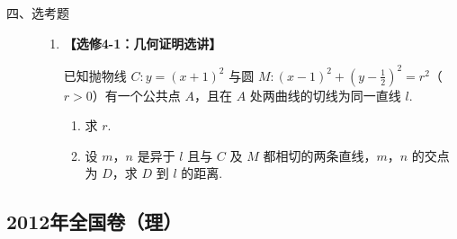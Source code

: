\begin{description}

    \item[四、选考题]

    \begin{enumerate}[leftmargin=5pt]

      \addtocounter{enumi}{+21}

        \item \textbf{【选修4-1：几何证明选讲】}

已知抛物线 \(C: y = (x + 1)^2\) 与圆 \(M: (x - 1)^2 + (y - \frac{1}{2})^2 = r^2\)（\(r > 0\)）有一个公共点 \(A\)，且在 \(A\) 处两曲线的切线为同一直线 \(l\).
\begin{enumerate}
\item 求 \(r\).
\item 设 \(m\)，\(n\) 是异于 \(l\) 且与 \(C\) 及 \(M\) 都相切的两条直线，\(m\)，\(n\) 的交点为 \(D\)，求 \(D\) 到 \(l\) 的距离.
\end{enumerate}

    \end{enumerate}

\end{description}


\subsection{2012年全国卷（理）}\label{gk:2012年全国卷（理）}

